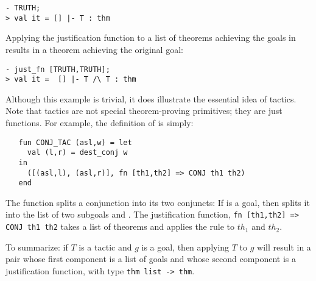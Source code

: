 \begin{session}\begin{verbatim}
- TRUTH;
> val it = [] |- T : thm
\end{verbatim}\end{session}

\noindent Applying the justification function  to a list
of theorems achieving the goals in  results
in a theorem achieving the original goal:

\begin{session}\begin{verbatim}
- just_fn [TRUTH,TRUTH];
> val it =  [] |- T /\ T : thm
\end{verbatim}\end{session}

    Although this example is trivial, it does illustrate the essential
    idea of tactics.  Note that tactics are not special
    theorem-proving primitives; they are just \ML{} functions.  For
    example, the definition of  is simply:

\begin{hol}\begin{verbatim}
   fun CONJ_TAC (asl,w) = let
     val (l,r) = dest_conj w
   in
     ([(asl,l), (asl,r)], fn [th1,th2] => CONJ th1 th2)
   end
\end{verbatim}\end{hol}

\noindent The function  splits a conjunction into its
two conjuncts: If  is a
goal, then  splits it into the list of two subgoals
 and . The justification function,
{\small\verb|fn [th1,th2] => CONJ th1 th2|} takes a list
\ml{[$th_1$,$th_2$]} of theorems and applies the rule  to
$th_1$ and $th_2$.

To summarize: if $T$ is a tactic and $g$ is a goal, then applying $T$
to $g$ will result in a pair whose first component is a list of goals
and whose second component is a justification function, with \ML{} type
{\small\verb|thm list -> thm|}.

